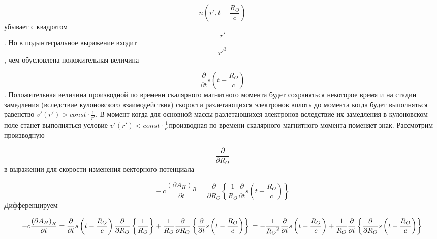 \documentclass[11pt]{article}
\begin{document}
 \begin{equation}n\left(
r',t-\frac{{{R}_{O}}}{c} \right)\end{equation}убывает с квадратом \begin{equation}r'\end{equation}. Но в
подынтегральное выражение входит \begin{equation}r{{'}^{3}}\end{equation}, чем
обусловлена положительная величина

\begin{equation}\frac{\partial }{\partial t}s\left( t-\frac{{{R}_{O}}}{c} \right)\end{equation}.
Положительная величина производной по времени скалярного магнитного
момента будет сохраняться некоторое время и на стадии замедления
(вследствие кулоновского взаимодействия) скорости разлетающихся
электронов вплоть до момента когда будет выполняться равенство
\(v'\left( r' \right)>const\cdot \frac{1}{r'}\). В момент когда для
основной массы разлетающихся электронов вследствие их замедления в
кулоновском поле станет выполняться условие
\(v'\left( r' \right)<const\cdot \frac{1}{r'}\)производная по времени
скалярного магнитного момента поменяет знак. Рассмотрим производную

\begin{equation}\frac{\partial }{\partial {{R}_{O}}}\end{equation}в выражении для скорости
изменения векторного потенциала

\begin{equation}-~c\frac{{{\left( \partial {{A}_{H}} \right)}_{R}}}{\partial t}=\frac{\partial }{\partial {{R}_{O}}}\left\{
\frac{1}{{{R}_{O}}}\frac{\partial }{\partial t}s\left(
t-\frac{{{R}_{O}}}{c} \right) \right\}\end{equation} Дифференцируем

\begin{equation}
 -c\frac{{{\left( \partial {{A}_{H}} \right)}_{R}}}{\partial t}=\frac{\partial }{\partial t}s\left( t-\frac{{{R}_{O}}}{c} \right)\frac{\partial }{\partial {{R}_{O}}}\left\{ \frac{1}{{{R}_{O}}} \right\}+\frac{1}{{{R}_{O}}}\frac{\partial }{\partial {{R}_{O}}}\left\{ \frac{\partial }{\partial t}s\left( t-\frac{{{R}_{O}}}{c} \right) \right\} \\ 
 =-\frac{1}{{{R}_{O}}^{2}}\frac{\partial }{\partial t}s\left( t-\frac{{{R}_{O}}}{c} \right)+\frac{1}{{{R}_{O}}}\frac{\partial }{\partial t}\left\{ \frac{\partial }{\partial {{R}_{O}}}s\left( t-\frac{{{R}_{O}}}{c} \right) \right\} \\ 
\end{equation}
\end{document}
